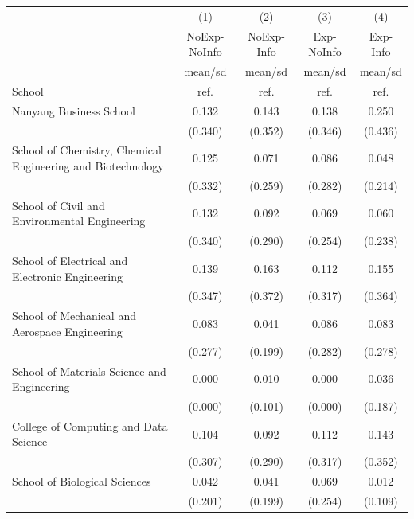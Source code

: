 {
\def\sym#1{\ifmmode^{#1}\else\(^{#1}\)\fi}
\begin{tabular}{l*{4}{c}}
\toprule
                    &\multicolumn{1}{c}{(1)}&\multicolumn{1}{c}{(2)}&\multicolumn{1}{c}{(3)}&\multicolumn{1}{c}{(4)}\\
                    &\multicolumn{1}{c}{NoExp-NoInfo}&\multicolumn{1}{c}{NoExp-Info}&\multicolumn{1}{c}{Exp-NoInfo}&\multicolumn{1}{c}{Exp-Info}\\
                    &     mean/sd&     mean/sd&     mean/sd&     mean/sd\\
\midrule
School              &        ref.&        ref.&        ref.&        ref.\\
Nanyang Business School&       0.132&       0.143&       0.138&       0.250\\
                    &     (0.340)&     (0.352)&     (0.346)&     (0.436)\\
School of Chemistry, Chemical Engineering and Biotechnology&       0.125&       0.071&       0.086&       0.048\\
                    &     (0.332)&     (0.259)&     (0.282)&     (0.214)\\
School of Civil and Environmental Engineering&       0.132&       0.092&       0.069&       0.060\\
                    &     (0.340)&     (0.290)&     (0.254)&     (0.238)\\
School of Electrical and Electronic Engineering&       0.139&       0.163&       0.112&       0.155\\
                    &     (0.347)&     (0.372)&     (0.317)&     (0.364)\\
School of Mechanical and Aerospace Engineering&       0.083&       0.041&       0.086&       0.083\\
                    &     (0.277)&     (0.199)&     (0.282)&     (0.278)\\
School of Materials Science and Engineering&       0.000&       0.010&       0.000&       0.036\\
                    &     (0.000)&     (0.101)&     (0.000)&     (0.187)\\
College of Computing and Data Science&       0.104&       0.092&       0.112&       0.143\\
                    &     (0.307)&     (0.290)&     (0.317)&     (0.352)\\
School of Biological Sciences&       0.042&       0.041&       0.069&       0.012\\
                    &     (0.201)&     (0.199)&     (0.254)&     (0.109)\\

\end{tabular}}
